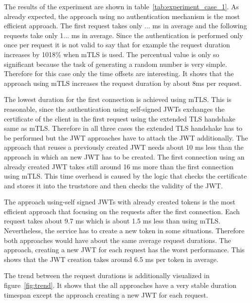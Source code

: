 The results of the experiment are shown in table~\ref{tab:experiment_case_1}.
As already expected, the approach using no authentication mechanism is the most efficient approach.
The first request takes only ... ms in average and the following requests take only 1... ms in average.
Since the authentication is performed only once per request it is not valid to say that for example the request duration increases by 1018\% when mTLS is used.
The percentual value is only so significant because the task of generating a random number is very simple.
Therefore for this case only the time offsets are interesting.
It shows that the approach using mTLS increases the request duration by about 8ms per request.

The lowest duration for the first connection is achieved using mTLS.
This is reasonable, since the authentication using self-signed JWTs exchanges the certificate of the client in the first request using the extended TLS handshake same as mTLS.
Therefore in all three cases the extended TLS handshake has to be performed but the JWT approaches have to attach the JWT additionally.
The approach that reuses a previously created JWT needs about 10 ms less than the approach in which an new JWT has to be created.
The first connection using an already created JWT takes still around 16 ms more than the first connection using mTLS.
This time overhead is caused by the logic that checks the certificate and stores it into the truststore and then checks the validity of the JWT.

The approach using-self signed JWTs with already created tokens is the most efficient approach that focusing on the requests after the first connection.
Each request takes about 9.7 ms which is about 1.5 ms less than using mTLS.
Nevertheless, the service has to create a new token in some situations. 
Therefore both approaches would have about the same average request durations.
The approach, creating a new JWT for each request has the worst performance.
This shows that the JWT creation takes around 6.5 ms per token in average.

The trend between the request durations is additionally visualized in figure~\ref{fig:trend}.
It shows that the all approaches have a very stable duration timespan except the approach creating a new JWT for each request.

